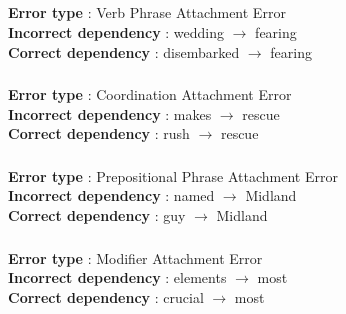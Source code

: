 \documentclass{article}
\begin{document}
\subsection{}
\subsubsection{}
\textbf{Error type} : Verb Phrase Attachment Error \\
\textbf{Incorrect dependency} : wedding $\rightarrow$ fearing \\
\textbf{Correct dependency} : disembarked $\rightarrow$ fearing \\

\subsubsection{}
\textbf{Error type} : Coordination Attachment Error \\
\textbf{Incorrect dependency} : makes $\rightarrow$ rescue \\
\textbf{Correct dependency} : rush $\rightarrow$ rescue \\

\subsubsection{}
\textbf{Error type} : Prepositional Phrase Attachment Error \\
\textbf{Incorrect dependency} : named $\rightarrow$ Midland \\
\textbf{Correct dependency} : guy $\rightarrow$ Midland \\

\subsubsection{}
\textbf{Error type} : Modifier Attachment Error \\
\textbf{Incorrect dependency} : elements $\rightarrow$ most \\
\textbf{Correct dependency} : crucial $\rightarrow$ most \\
\end{document}
